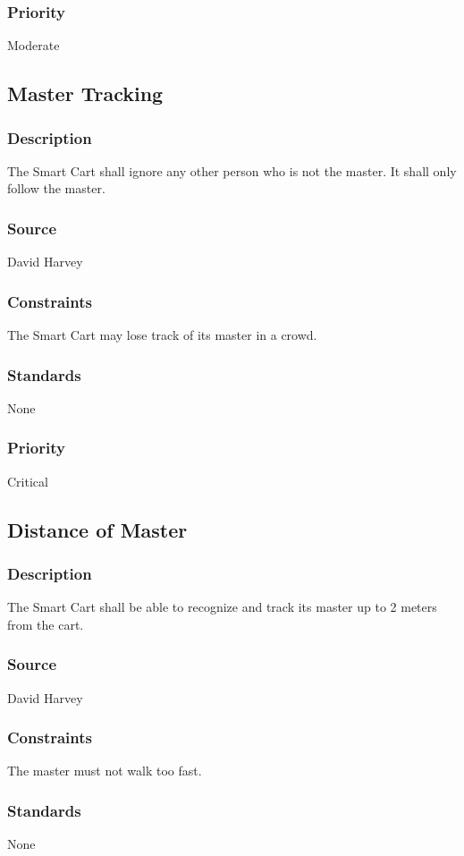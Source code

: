 \subsubsection{Priority}
Moderate


\subsection{Master Tracking}
\subsubsection{Description}
The Smart Cart shall ignore any other person who is not the master. It shall only follow the master.
\subsubsection{Source}
David Harvey
\subsubsection{Constraints}
The Smart Cart may lose track of its master in a crowd.
\subsubsection{Standards}
None
\subsubsection{Priority}
Critical


\subsection{Distance of Master}
\subsubsection{Description}
The Smart Cart shall be able to recognize and track its master up to 2 meters from the cart. 
\subsubsection{Source}
David Harvey
\subsubsection{Constraints}
The master must not walk too fast.
\subsubsection{Standards}
None
